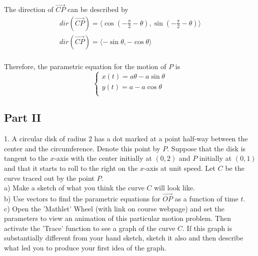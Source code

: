\documentclass{article}
\begin{document}
The direction of $\vec{CP}$ can be described by
\begin{gather*}
  dir(\vec{CP}) = \langle \cos(-\frac{\pi}{2} - \theta), \sin(-\frac{\pi}{2} - \theta) \rangle \\
  dir(\vec{CP}) = \langle -\sin\theta, -\cos\theta \rangle \\
\end{gather*}

Therefore, the parametric equation for the motion of $P$ is
\begin{equation*}
  \begin{cases}
    x(t) = a \theta - a \sin\theta \\
    y(t) = a - a \cos\theta \\
  \end{cases}
\end{equation*}

\begin{center}
\section*{Part II}
\end{center}

\bigskip

1. A circular disk of radius 2 has a dot marked at a point half-way between the 
center and the circumference. Denote this point by $P$. Suppose that the disk is 
tangent to the $x$-axis with the center initially at $(0, 2)$ and $P$ initially 
at $(0, 1)$ and that it starts to roll to the right on the $x$-axis at unit 
speed. Let $C$ be the curve traced out by the point $P$. \\
a) Make a sketch of what you think the curve $C$ will look like. \\
b) Use vectors to find the parametric equations for $\vec{OP}$ as a function of 
time $t$. \\
c) Open the 'Mathlet' Wheel (with link on course webpage) and set the parameters 
to view an animation of this particular motion problem. Then activate the 
'Trace' function to see a graph of the curve $C$. If this graph is substantially 
different from your hand sketch, sketch it also and then describe what led you 
to produce your first idea of the graph.
\end{document}
